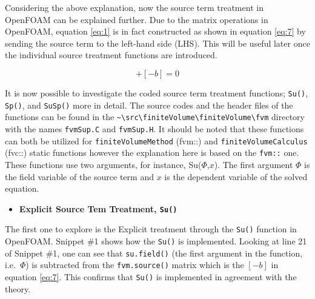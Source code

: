\documentclass[
]{book}
\providecommand{\tightlist}{%
  \setlength{\itemsep}{0pt}\setlength{\parskip}{0pt}}
\begin{document}
Considering the above explanation, now the source term treatment in OpenFOAM can be explained further. Due to the matrix operations in OpenFOAM, equation \eqref{eq:1} is in fact constructed as shown in equation \eqref{eq:7} by sending the source term to the left-hand side (LHS). This will be useful later once the individual source treatment functions are introduced.

\begin{equation}
[A][x] + [-b] = 0
\label{eq:7}
\end{equation}

It is now possible to investigate the coded source term treatment functions; \texttt{Su()}, \texttt{Sp()}, and \texttt{SuSp()} more in detail. The source codes and the header files of the functions can be found in the \texttt{\textasciitilde{}\textbackslash{}src\textbackslash{}finiteVolume\textbackslash{}finiteVolume\textbackslash{}fvm} directory with the names \texttt{fvmSup.C} and \texttt{fvmSup.H}. It should be noted that these functions can both be utilized for \texttt{finiteVolumeMethod} (fvm::) and \texttt{finiteVolumeCalculus} (fvc::) static functions however the explanation here is based on the \texttt{fvm::} one. These functions use two arguments, for instance, Su(\(\Phi\),\(x\)). The first argument \(\Phi\) is the field variable of the source term and \(x\) is the dependent variable of the solved equation.

\begin{itemize}
\tightlist
\item
  \textbf{Explicit Source Tem Treatment, \texttt{Su()}}
\end{itemize}

The first one to explore is the Explicit treatment through the \texttt{Su()} function in OpenFOAM. Snippet \#1 shows how the \texttt{Su()} is implemented. Looking at line 21 of Snippet \#1, one can see that \texttt{su.field()} (the first argument in the function, i.e.~\(\Phi\)) is subtracted from the \texttt{fvm.source()} matrix which is the \([-b]\) in equation \eqref{eq:7}. This confirms that \texttt{Su()} is implemented in agreement with the theory.
\end{document}
